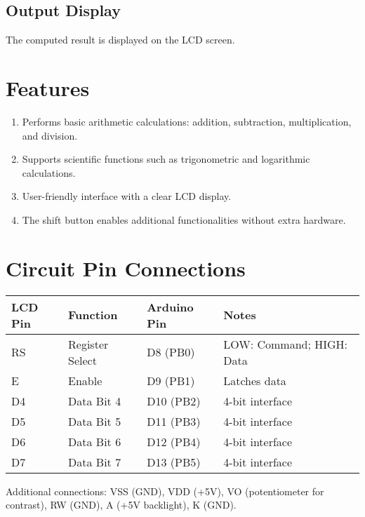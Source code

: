 \documentclass[journal,12pt,onecolumn,article]{IEEEtran}
\theoremstyle{remark}
\begin{document}
\subsection{Output Display}
The computed result is displayed on the LCD screen.

\section{Features}
\begin{enumerate}
    \item Performs basic arithmetic calculations: addition, subtraction, multiplication, and division.
    \item Supports scientific functions such as trigonometric and logarithmic calculations.
    \item User-friendly interface with a clear LCD display.
    \item The shift button enables additional functionalities without extra hardware.
\end{enumerate}

\section{Circuit Pin Connections}
\centering
\begin{tabular}{|l|l|l|l|}
\hline
\textbf{LCD Pin} & \textbf{Function} & \textbf{Arduino Pin} & \textbf{Notes} \\ \hline
RS             & Register Select & D8 (PB0)           & LOW: Command; HIGH: Data \\ \hline
E              & Enable          & D9 (PB1)           & Latches data \\ \hline
D4             & Data Bit 4      & D10 (PB2)          & 4-bit interface \\ \hline
D5             & Data Bit 5      & D11 (PB3)          & 4-bit interface \\ \hline
D6             & Data Bit 6      & D12 (PB4)          & 4-bit interface \\ \hline
D7             & Data Bit 7      & D13 (PB5)          & 4-bit interface \\ \hline
\end{tabular}

\bigskip
Additional connections: VSS (GND), VDD (+5V), VO (potentiometer for contrast), RW (GND), A (+5V backlight), K (GND).
\end{document}
